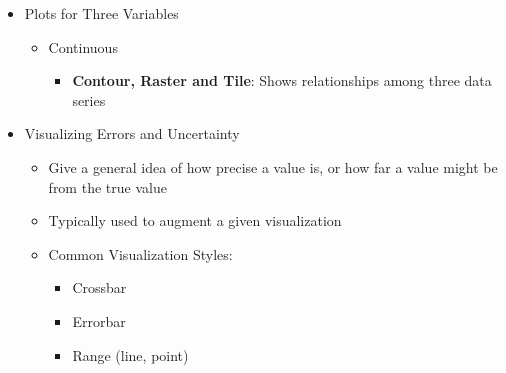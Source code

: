 \begin{itemize}
\begin{itemize}
\begin{itemize}
			  \item {\bf Column}: Correlations among things or information changes over time
			  \item {\bf Box, Dot, Violin}: Compare distributions between many groups, display spread and skew of data
			\end{itemize}
	   \item Both Discrete
			\begin{itemize}
				\item {\bf Points/Counts}: Magnitude of counts
				\item {\bf Jitter}: Plots of data points
			\end{itemize}
		\item Distributions of Two Variables
			\begin{itemize}
				\item {\bf Bin2D, Density2D, Hex}: Shows frequency of values over two continuous variables
			\end{itemize}
	\end{itemize}
	\item Plots for Three Variables
	\begin{itemize}
		\item Continuous
			\begin{itemize}
				\item {\bf Contour, Raster and Tile}: Shows relationships among three data series
			\end{itemize}
	\end{itemize}
	\item Visualizing Errors and Uncertainty
	\begin{itemize}
		\item Give a general idea of how precise a value is, or how far a value might be from the true value
		\item Typically used to augment a given visualization
		\item Common Visualization Styles:
			\begin{itemize}
			  \item Crossbar
			  \item Errorbar
			  \item Range (line, point)
			\end{itemize}  
	\end{itemize}
\end{itemize}


